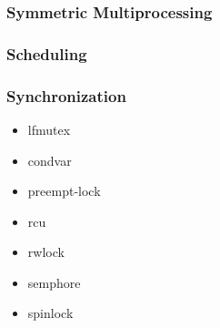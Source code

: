 \documentclass[10pt]{beamer}
\begin{document}
\begin{frame}
	\frametitle{Symmetric Multiprocessing}
  
	
\end{frame}



\begin{frame}
	\frametitle{Scheduling}


\end{frame}



\begin{frame}
	\frametitle{Synchronization}
	\begin{itemize}
		\item lfmutex
		\item condvar
		\item preempt-lock
		\item rcu
		\item rwlock
		\item semphore
		\item spinlock
	\end{itemize}
\end{frame}
\end{document}
